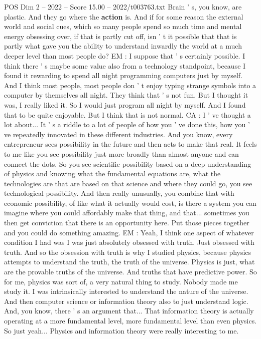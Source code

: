 \begin{textsample}{POS Dim 2 – 2022 – Score 15.00 – 2022/t003763.txt}
Brain ' s, you know, are plastic.
And they go where the \textbf{action} is.
And if for some reason the external world and social cues, which so many people spend so much time and mental energy obsessing over, if that is partly cut off, isn ' t it possible that that is partly what gave you the ability to understand inwardly the world at a much deeper level than most people do?
EM : I suppose that ' s certainly possible.
I think there ' s maybe some value also from a technology standpoint, because I found it rewarding to spend all night programming computers just by myself.
And I think most people, most people don ' t enjoy typing strange symbols into a computer by themselves all night.
They think that ' s not fun.
But I thought it was, I really liked it.
So I would just program all night by myself.
And I found that to be quite enjoyable.
But I think that is not normal.
CA : I ' ve thought a lot about...
It ' s a riddle to a lot of people of how you ' ve done this, how you ' ve repeatedly innovated in these different industries.
And you know, every entrepreneur sees possibility in the future and then acts to make that real.
It feels to me like you see possibility just more broadly than almost anyone and can connect the dots.
So you see scientific possibility based on a deep understanding of physics and knowing what the fundamental equations are, what the technologies are that are based on that science and where they could go, you see technological possibility.
And then really unusually, you combine that with economic possibility, of like what it actually would cost, is there a system you can imagine where you could affordably make that thing, and that... sometimes you then get conviction that there is an opportunity here.
Put those pieces together and you could do something amazing.
EM : Yeah, I think one aspect of whatever condition I had was I was just absolutely obsessed with truth.
Just obsessed with truth.
And so the obsession with truth is why I studied physics, because physics attempts to understand the truth, the truth of the universe.
Physics is just, what are the provable truths of the universe.
And truths that have predictive power.
So for me, physics was sort of, a very natural thing to study.
Nobody made me study it.
I was intrinsically interested to understand the nature of the universe.
And then computer science or information theory also to just understand logic.
And, you know, there ' s an argument that...
That information theory is actually operating at a more fundamental level, more fundamental level than even physics.
So just yeah...
Physics and information theory were really interesting to me.

\end{textsample}
